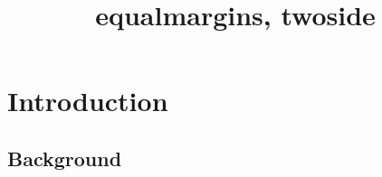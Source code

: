 \documentclass[
  equalmargins,
  twoside,
  a5paper,
]{ut-thesis}
\title{equalmargins, twoside}
\begin{document}
  \maketitle
  \chapter{Introduction}
  \lipsum[1-2]
  \section{Background}
  \lipsum[3-4]
\end{document}
